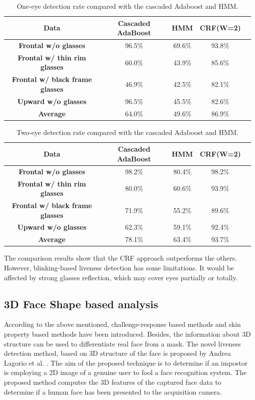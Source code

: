 \documentclass[journal]{IEEEtran}
\begin{document}
\begin{table}[!htbp]
\centering
\caption{One-eye detection rate compared with the cascaded Adaboost and HMM.}
\label{tab_D_1}
\begin{tabular}{ccccc}
\toprule
\textbf{Data} & Cascaded AdaBoost & HMM &  CRF(W=2) \\
\midrule
\textbf{Frontal w/o glasses} & 96.5\% & 69.6\% & 93.8\% \\
\textbf{Frontal w/ thin rim glasses} & 60.0\% & 43.9\% & 85.6\% \\
\textbf{Frontal w/ black frame glasses} & 46.9\% & 42.5\% & 82.1\% \\
\textbf{Upward w/o glasses} & 96.5\% & 45.5\% & 82.6\% \\
\midrule
\textbf{Average} & 64.0\% & 49.6\% & 86.9\% \\
\bottomrule
\end{tabular}
\end{table}

\begin{table}[!htbp]
\centering
\caption{Two-eye detection rate compared with the cascaded Adaboost and HMM.}
\label{tab_D_2}
\begin{tabular}{ccccc}
\toprule
\textbf{Data} & Cascaded AdaBoost & HMM &  CRF(W=2) \\
\midrule
\textbf{Frontal w/o glasses} & 98.2\% & 80.4\% & 98.2\% \\
\textbf{Frontal w/ thin rim glasses} & 80.0\% & 60.6\% & 93.9\% \\
\textbf{Frontal w/ black frame glasses} & 71.9\% & 55.2\% & 89.6\% \\
\textbf{Upward w/o glasses} & 62.3\% & 59.1\% & 92.4\% \\
\midrule
\textbf{Average} & 78.1\% & 63.4\% & 93.7\% \\
\bottomrule
\end{tabular}
\end{table}

The comparison results show that the CRF approach outperforms the others. However, blinking-based liveness detection has some limitations. It would be affected by strong glasses reflection, which may cover eyes partially or totally.

\subsection{3D Face Shape based analysis}

According to the above mentioned, challenge-response based methods and skin property based methods have been introduced. Besides, the information about 3D structure can be used to differentiate real face from a mask. The novel liveness detection method, based on 3D structure of the face is proposed by Andrea Lagorio et al. \cite{lagorio2013liveness}. The aim of the proposed technique is to determine if an impostor is employing a 2D image of a genuine user to fool a face recognition system. The proposed method computes the 3D features of the captured face data to determine if a human face has been presented to the acquisition camera.
\end{document}
